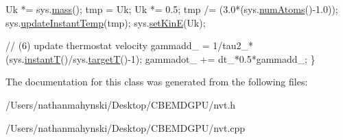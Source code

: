 \begin{DoxyCode}
    Uk *= sys.\hyperlink{classsystem_definition_acb6dd3df121e3e5bc0eb41c32bd937bd}{mass}();
    tmp = Uk;
    Uk *= 0.5;
    tmp /= (3.0*(sys.\hyperlink{classsystem_definition_ae8d3c2df2d56241cee03fcc4e2026ae0}{numAtoms}()-1.0));
    sys.\hyperlink{classsystem_definition_a285e6cd1de35ed125eecb20f0f774ab3}{updateInstantTemp}(tmp);
    sys.\hyperlink{classsystem_definition_a2b2c236698886bd1d106be802b987b61}{setKinE}(Uk);

    \textcolor{comment}{// (6) update thermostat velocity}
    gammadd\_ = 1/tau2\_*(sys.\hyperlink{classsystem_definition_af7b322cfc8abe7042fdbeb0af8e7aa7e}{instantT}()/sys.\hyperlink{classsystem_definition_a3c958df2ab99c0cb75c740346a5a4b6f}{targetT}()-1);
    gammadot\_ += dt\_*0.5*gammadd\_;
\}
\end{DoxyCode}


The documentation for this class was generated from the following files\-:\begin{DoxyCompactItemize}
\item 
/\-Users/nathanmahynski/\-Desktop/\-C\-B\-E\-M\-D\-G\-P\-U/nvt.\-h\item 
/\-Users/nathanmahynski/\-Desktop/\-C\-B\-E\-M\-D\-G\-P\-U/nvt.\-cpp\end{DoxyCompactItemize}
